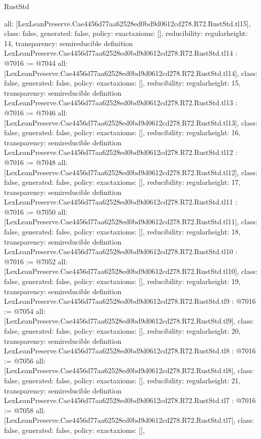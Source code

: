 \begin{lexlean}{RustStd}
\begin{coremodule}
{  all: [LexLeanPreserve.Cae4456d77aa62528ed0bd9d0612cd278.R72.RustStd.tl15],
  class: false,
  generated: false,
  policy: exact{axioms: []},
  reducibility: regular{height: 14},
  transparency: semireducible
}
definition LexLeanPreserve.Cae4456d77aa62528ed0bd9d0612cd278.R72.RustStd.tl14 : @7016 := @7044 {
  all: [LexLeanPreserve.Cae4456d77aa62528ed0bd9d0612cd278.R72.RustStd.tl14],
  class: false,
  generated: false,
  policy: exact{axioms: []},
  reducibility: regular{height: 15},
  transparency: semireducible
}
definition LexLeanPreserve.Cae4456d77aa62528ed0bd9d0612cd278.R72.RustStd.tl13 : @7016 := @7046 {
  all: [LexLeanPreserve.Cae4456d77aa62528ed0bd9d0612cd278.R72.RustStd.tl13],
  class: false,
  generated: false,
  policy: exact{axioms: []},
  reducibility: regular{height: 16},
  transparency: semireducible
}
definition LexLeanPreserve.Cae4456d77aa62528ed0bd9d0612cd278.R72.RustStd.tl12 : @7016 := @7048 {
  all: [LexLeanPreserve.Cae4456d77aa62528ed0bd9d0612cd278.R72.RustStd.tl12],
  class: false,
  generated: false,
  policy: exact{axioms: []},
  reducibility: regular{height: 17},
  transparency: semireducible
}
definition LexLeanPreserve.Cae4456d77aa62528ed0bd9d0612cd278.R72.RustStd.tl11 : @7016 := @7050 {
  all: [LexLeanPreserve.Cae4456d77aa62528ed0bd9d0612cd278.R72.RustStd.tl11],
  class: false,
  generated: false,
  policy: exact{axioms: []},
  reducibility: regular{height: 18},
  transparency: semireducible
}
definition LexLeanPreserve.Cae4456d77aa62528ed0bd9d0612cd278.R72.RustStd.tl10 : @7016 := @7052 {
  all: [LexLeanPreserve.Cae4456d77aa62528ed0bd9d0612cd278.R72.RustStd.tl10],
  class: false,
  generated: false,
  policy: exact{axioms: []},
  reducibility: regular{height: 19},
  transparency: semireducible
}
definition LexLeanPreserve.Cae4456d77aa62528ed0bd9d0612cd278.R72.RustStd.tl9 : @7016 := @7054 {
  all: [LexLeanPreserve.Cae4456d77aa62528ed0bd9d0612cd278.R72.RustStd.tl9],
  class: false,
  generated: false,
  policy: exact{axioms: []},
  reducibility: regular{height: 20},
  transparency: semireducible
}
definition LexLeanPreserve.Cae4456d77aa62528ed0bd9d0612cd278.R72.RustStd.tl8 : @7016 := @7056 {
  all: [LexLeanPreserve.Cae4456d77aa62528ed0bd9d0612cd278.R72.RustStd.tl8],
  class: false,
  generated: false,
  policy: exact{axioms: []},
  reducibility: regular{height: 21},
  transparency: semireducible
}
definition LexLeanPreserve.Cae4456d77aa62528ed0bd9d0612cd278.R72.RustStd.tl7 : @7016 := @7058 {
  all: [LexLeanPreserve.Cae4456d77aa62528ed0bd9d0612cd278.R72.RustStd.tl7],
  class: false,
  generated: false,
  policy: exact{axioms: []},
}
\end{coremodule}
\end{lexlean}
